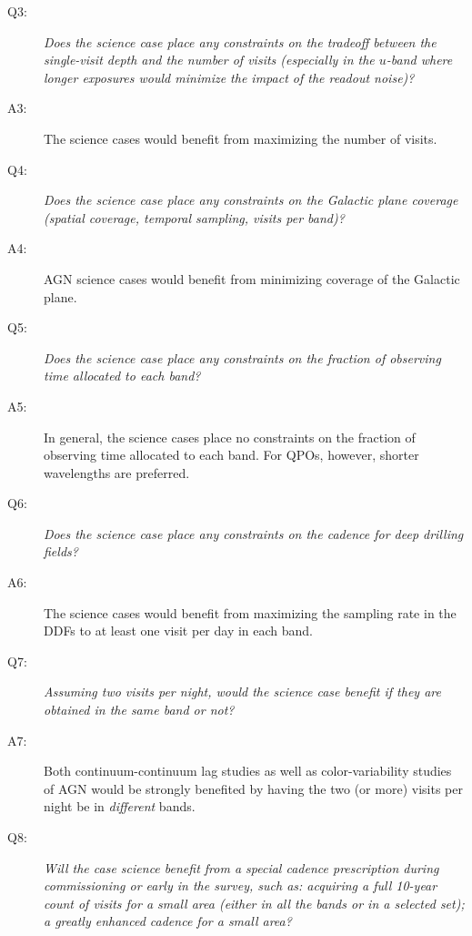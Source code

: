 \begin{description}

\item[Q3:] {\it Does the science case place any constraints on the
tradeoff between the single-visit depth and the number of visits
(especially in the $u$-band where longer exposures would minimize the
impact of the readout noise)?}

\item[A3:] The science cases would benefit from maximizing the number of visits.

\item[Q4:] {\it Does the science case place any constraints on the
Galactic plane coverage (spatial coverage, temporal sampling, visits per
band)?}

\item[A4:] AGN science cases would benefit from minimizing coverage of
the Galactic plane.

\item[Q5:] {\it Does the science case place any constraints on the
fraction of observing time allocated to each band?}

\item[A5:] In general, the science cases place no constraints on
the fraction of observing time allocated to each band.
For QPOs, however, shorter wavelengths are preferred.

\item[Q6:] {\it Does the science case place any constraints on the
cadence for deep drilling fields?}

\item[A6:] The science cases would benefit from maximizing the sampling
rate in the DDFs to at least one visit per day in each band.

\item[Q7:] {\it Assuming two visits per night, would the science case
benefit if they are obtained in the same band or not?}

\item[A7:] Both continuum-continuum lag studies as well as color-variability studies
of AGN would be strongly benefited by having the two (or more) visits per night be in
\emph{different} bands.

\item[Q8:] {\it Will the case science benefit from a special cadence
prescription during commissioning or early in the survey, such as:
acquiring a full 10-year count of visits for a small area (either in all
the bands or in a  selected set); a greatly enhanced cadence for a small
area?}


\end{description}
